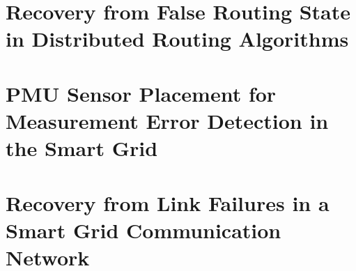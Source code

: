 \documentclass{umthesis}          %
\begin{document}



\chapter{Recovery from False Routing State in Distributed Routing Algorithms}
\label{ch:rollback}






















\chapter{PMU Sensor Placement for Measurement Error Detection in the Smart Grid}
\label{ch:pmu}








 








\chapter{Recovery from Link Failures in a Smart Grid Communication Network}
\label{ch:reliable-mcast}

%

%

%

%

%
\end{document}
